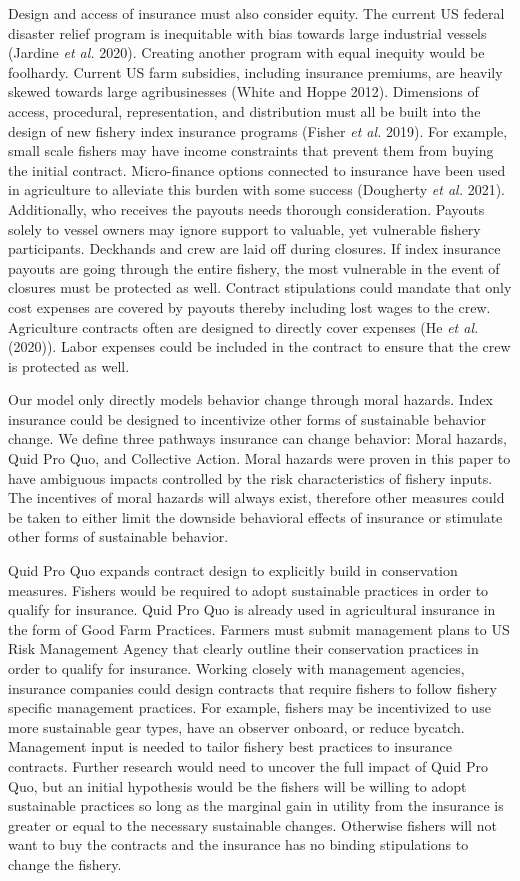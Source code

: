 \documentclass[
  letterpaper,
  DIV=11,
  numbers=noendperiod]{scrartcl}
\theoremstyle{plain}
\theoremstyle{plain}
\theoremstyle{remark}
\begin{document}
Design and access of insurance must also consider equity. The current US
federal disaster relief program is inequitable with bias towards large
industrial vessels (Jardine \emph{et al.} 2020). Creating another
program with equal inequity would be foolhardy. Current US farm
subsidies, including insurance premiums, are heavily skewed towards
large agribusinesses (White and Hoppe 2012). Dimensions of access,
procedural, representation, and distribution must all be built into the
design of new fishery index insurance programs (Fisher \emph{et al.}
2019). For example, small scale fishers may have income constraints that
prevent them from buying the initial contract. Micro-finance options
connected to insurance have been used in agriculture to alleviate this
burden with some success (Dougherty \emph{et al.} 2021). Additionally,
who receives the payouts needs thorough consideration. Payouts solely to
vessel owners may ignore support to valuable, yet vulnerable fishery
participants. Deckhands and crew are laid off during closures. If index
insurance payouts are going through the entire fishery, the most
vulnerable in the event of closures must be protected as well. Contract
stipulations could mandate that only cost expenses are covered by
payouts thereby including lost wages to the crew. Agriculture contracts
often are designed to directly cover expenses (He \emph{et al.} (2020)).
Labor expenses could be included in the contract to ensure that the crew
is protected as well.

Our model only directly models behavior change through moral hazards.
Index insurance could be designed to incentivize other forms of
sustainable behavior change. We define three pathways insurance can
change behavior: Moral hazards, Quid Pro Quo, and Collective Action.
Moral hazards were proven in this paper to have ambiguous impacts
controlled by the risk characteristics of fishery inputs. The incentives
of moral hazards will always exist, therefore other measures could be
taken to either limit the downside behavioral effects of insurance or
stimulate other forms of sustainable behavior.

Quid Pro Quo expands contract design to explicitly build in conservation
measures. Fishers would be required to adopt sustainable practices in
order to qualify for insurance. Quid Pro Quo is already used in
agricultural insurance in the form of Good Farm Practices. Farmers must
submit management plans to US Risk Management Agency that clearly
outline their conservation practices in order to qualify for insurance.
Working closely with management agencies, insurance companies could
design contracts that require fishers to follow fishery specific
management practices. For example, fishers may be incentivized to use
more sustainable gear types, have an observer onboard, or reduce
bycatch. Management input is needed to tailor fishery best practices to
insurance contracts. Further research would need to uncover the full
impact of Quid Pro Quo, but an initial hypothesis would be the fishers
will be willing to adopt sustainable practices so long as the marginal
gain in utility from the insurance is greater or equal to the necessary
sustainable changes. Otherwise fishers will not want to buy the
contracts and the insurance has no binding stipulations to change the
fishery.
\end{document}
